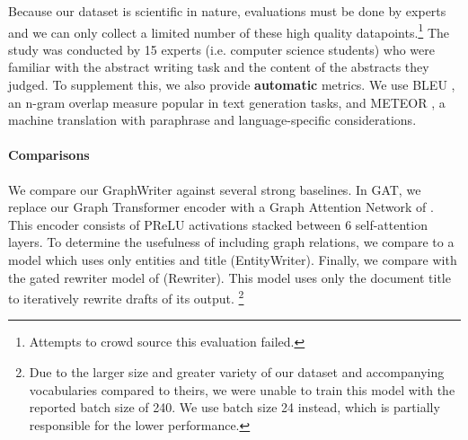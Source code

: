 \documentclass[11pt,a4paper]{article}
\begin{document}
Because our dataset is scientific in nature, evaluations must be done by experts and we can only collect a limited number of these high quality datapoints.\footnote{Attempts to crowd source this evaluation failed.}
The study was conducted by 15 experts (i.e. computer science students) who were familiar with the abstract writing task and the content of the abstracts they judged. 
To supplement this, we also provide \textbf{automatic} metrics. 
We use BLEU \cite{Papineni2002BleuAM}, an n-gram overlap measure popular in text generation tasks, and METEOR \cite{Denkowski2014MeteorUL}, a machine translation with paraphrase and language-specific considerations.

\paragraph{Comparisons} 
We compare our GraphWriter against several strong baselines. 
In GAT, we replace our Graph Transformer encoder with a Graph Attention Network of \citep{velickovic2017graph}.
This encoder consists of PReLU activations stacked between 6 self-attention layers.
To determine the usefulness of including graph relations, we compare to a model which uses only entities and title (EntityWriter).
Finally, we compare with the gated rewriter model of \citet{wang2018paper} (Rewriter).
This model uses only the document title to iteratively rewrite drafts of its output. \footnote{Due to the larger size and greater variety of our dataset and accompanying vocabularies compared to theirs, we were unable to train this model with the reported batch size of 240. We use batch size 24 instead, which is partially responsible for the lower performance.}
\end{document}
